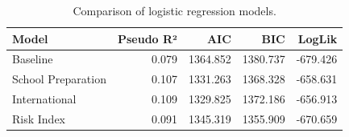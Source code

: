 \begin{table}
\caption{Comparison of logistic regression models.}
\label{tab:model-comparison}
\begin{tabular}{lrrrr}
\toprule
Model & Pseudo R² & AIC & BIC & LogLik \\
\midrule
Baseline & 0.079 & 1364.852 & 1380.737 & -679.426 \\
School Preparation & 0.107 & 1331.263 & 1368.328 & -658.631 \\
International & 0.109 & 1329.825 & 1372.186 & -656.913 \\
Risk Index & 0.091 & 1345.319 & 1355.909 & -670.659 \\
\bottomrule
\end{tabular}
\end{table}
